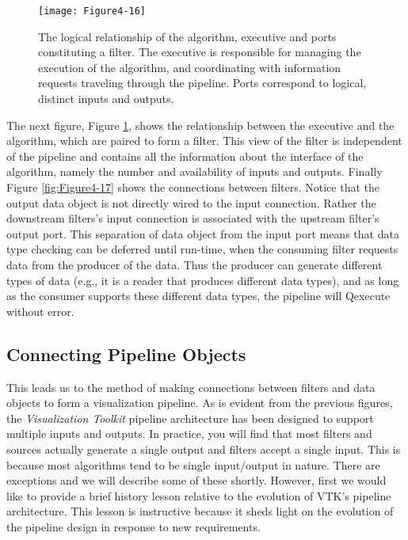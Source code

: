 \begin{figure}[!htb]
  \centering
  \texttt{[image: Figure4-16]}\\
  \caption{The logical relationship of the algorithm, executive and ports constituting a filter. The executive is responsible for managing the execution of the algorithm, and coordinating with information requests traveling through the pipeline. Ports correspond to logical, distinct inputs and outputs.}\label{fig:Figure4-16}
\end{figure}

The next figure, Figure \ref{fig:Figure4-16}, shows the relationship between the executive and the algorithm, which are paired to form a filter. This view of the filter is independent of the pipeline and contains all the information about the interface of the algorithm, namely the number and availability of inputs and outputs. Finally Figure \ref{fig:Figure4-17} shows the connections between filters. Notice that the output data object is not directly wired to the input connection. Rather the downstream filters's input connection is associated with the upstream filter's output port. This separation of data object from the input port means that data type checking can be deferred until run-time, when the consuming filter requests data from the producer of the data. Thus the producer can generate different types of data (e.g., it is a reader that produces different data types), and as long as the consumer supports these different data types, the pipeline will Qexecute without error.

\subsection{Connecting Pipeline Objects}
\label{subsec:connecting_pipeline_objects}

This leads us to the method of making connections between filters and data objects to form a visualization pipeline. As is evident from the previous figures, the \emph{Visualization Toolkit} pipeline architecture has been designed to support multiple inputs and outputs. In practice, you will find that most filters and sources actually generate a single output and filters accept a single input. This is because most algorithms tend to be single input/output in nature. There are exceptions and we will describe some of these shortly. However, first we would like to provide a brief history lesson relative to the evolution of VTK's pipeline architecture. This lesson is instructive because it sheds light on the evolution of the pipeline design in response to new requirements.

